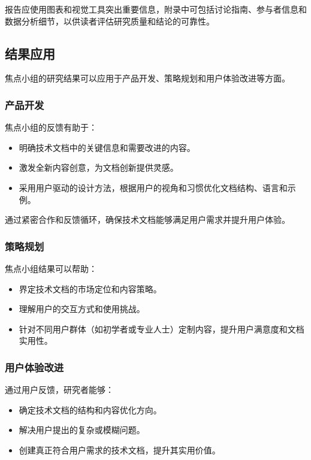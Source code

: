 \documentclass[letterpaper,10pt,english]{sphinxmanual}
\begin{document}
\sphinxAtStartPar
报告应使用图表和视觉工具突出重要信息，附录中可包括讨论指南、参与者信息和数据分析细节，以供读者评估研究质量和结论的可靠性。


\subsection{结果应用}
\label{\detokenize{user-research/focus-group:id27}}
\sphinxAtStartPar
焦点小组的研究结果可以应用于产品开发、策略规划和用户体验改进等方面。


\subsubsection{产品开发}
\label{\detokenize{user-research/focus-group:id28}}
\sphinxAtStartPar
焦点小组的反馈有助于：
\begin{itemize}
\item {} 
\sphinxAtStartPar
明确技术文档中的关键信息和需要改进的内容。

\item {} 
\sphinxAtStartPar
激发全新内容创意，为文档创新提供灵感。

\item {} 
\sphinxAtStartPar
采用用户驱动的设计方法，根据用户的视角和习惯优化文档结构、语言和示例。

\end{itemize}

\sphinxAtStartPar
通过紧密合作和反馈循环，确保技术文档能够满足用户需求并提升用户体验。


\subsubsection{策略规划}
\label{\detokenize{user-research/focus-group:id29}}
\sphinxAtStartPar
焦点小组结果可以帮助：
\begin{itemize}
\item {} 
\sphinxAtStartPar
界定技术文档的市场定位和内容策略。

\item {} 
\sphinxAtStartPar
理解用户的交互方式和使用挑战。

\item {} 
\sphinxAtStartPar
针对不同用户群体（如初学者或专业人士）定制内容，提升用户满意度和文档实用性。

\end{itemize}


\subsubsection{用户体验改进}
\label{\detokenize{user-research/focus-group:id30}}
\sphinxAtStartPar
通过用户反馈，研究者能够：
\begin{itemize}
\item {} 
\sphinxAtStartPar
确定技术文档的结构和内容优化方向。

\item {} 
\sphinxAtStartPar
解决用户提出的复杂或模糊问题。

\item {} 
\sphinxAtStartPar
创建真正符合用户需求的技术文档，提升其实用价值。

\end{itemize}
\end{document}
